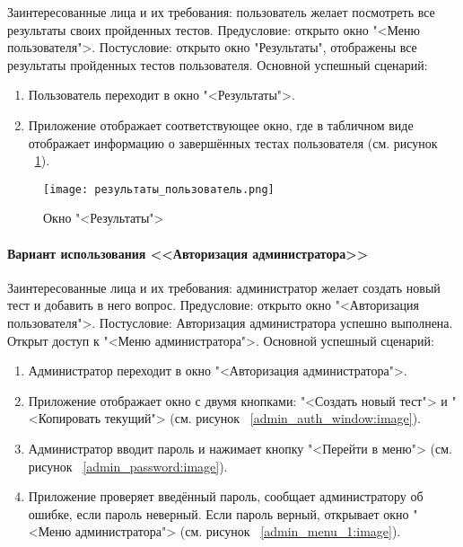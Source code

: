 Заинтересованные лица и их требования: пользователь желает посмотреть все результаты своих пройденных тестов.
\newline Предусловие: открыто окно "<Меню пользователя">.
\newline Постусловие: открыто окно "Результаты", отображены все результаты пройденных тестов пользователя.
\newline Основной успешный сценарий:
\begin{enumerate}
	\item Пользователь переходит в окно "<Результаты">.
	\item Приложение отображает соответствующее окно, где в табличном виде отображает информацию о завершённых тестах пользователя (см. рисунок ~\ref{user_results:image}).
\end{enumerate}

\begin{figure}[H]
	\centering
	\texttt{[image: результаты\_пользователь.png]}
	\caption{Окно "<Результаты">}
	\label{user_results:image}
\end{figure}


\paragraph{Вариант использования <<Авторизация администратора>>}

Заинтересованные лица и их требования: администратор желает создать новый тест и добавить в него вопрос.
\newline Предусловие: открыто окно "<Авторизация пользователя">.
\newline Постусловие: Авторизация администратора успешно выполнена. Открыт доступ к "<Меню администратора">.
\newline Основной успешный сценарий:
\begin{enumerate}
	\item Администратор переходит в окно "<Авторизация администратора">.
	\item Приложение отображает окно с двумя кнопками: "<Создать новый тест"> и "<Копировать текущий"> (см. рисунок ~\ref{admin_auth_window:image}).
	\item Администратор вводит пароль и нажимает кнопку "<Перейти в меню"> (см. рисунок ~\ref{admin_password:image}).
	\item Приложение проверяет введённый пароль, сообщает администратору об ошибке, если пароль неверный. Если пароль верный, открывает окно "<Меню администратора"> (см. рисунок ~\ref{admin_menu_1:image}).
\end{enumerate}

